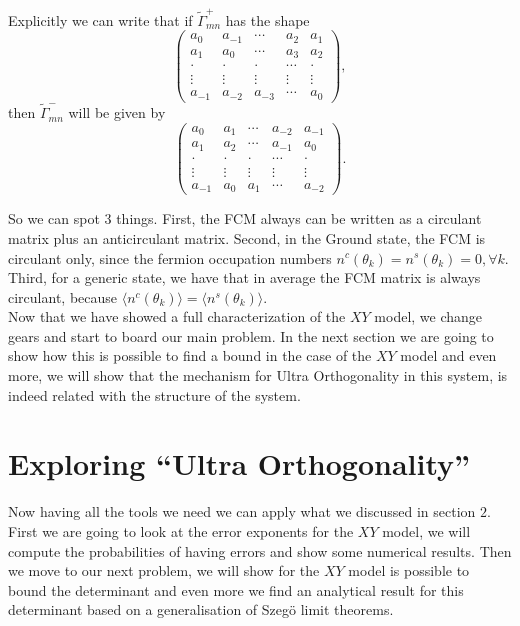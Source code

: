 Explicitly we can write that if $\tilde{\Gamma}^{+}_{mn}$ has the shape
\begin{equation}
\left(\begin{array}{ccccc}
a_{0} & a_{-1} & \cdots & a_{2} & a_{1} \\
a_{1} & a_{0} & \cdots & a_{3} & a_{2} \\
\cdot & \cdot & \cdot & \cdots & \cdot \\
\vdots & \vdots & \vdots & \vdots & \vdots \\
a_{-1} & a_{-2} & a_{-3} & \cdots & a_{0}
\end{array}\right),
\end{equation}
then $\tilde{\Gamma}^{-}_{mn}$ will be given by
\begin{equation}
\left(\begin{array}{ccccc}
a_{0} & a_{1} & \cdots & a_{-2} & a_{-1} \\
a_{1} & a_{2} & \cdots & a_{-1} & a_{0} \\
\cdot & \cdot & \cdot & \cdots & \cdot \\
\vdots & \vdots & \vdots & \vdots & \vdots \\
a_{-1} & a_{0} & a_{1} & \cdots & a_{-2}
\end{array}\right).
\end{equation}

So we can spot 3 things. First, the FCM always can be written as a circulant matrix plus an anticirculant matrix. Second, in the Ground state, the FCM is circulant only, since the fermion occupation numbers $n^{c}\left(\theta_{k}\right)=n^{s}\left(\theta_{k}\right)=0, \forall k$. Third, for a generic state, we have that in average the FCM matrix is always circulant, because $\langle n^{c}\left(\theta_{k}\right)\rangle=\langle n^{s}\left(\theta_{k}\right)\rangle$.\\
Now that we have showed a full characterization of the $XY$ model, we change gears and start to board our main problem. In the next section we are going to show how this is possible to find a bound in the case of the $XY$ model and even more, we will show that the mechanism for Ultra Orthogonality in this system, is indeed related with the structure of the system.


\section{Exploring ``Ultra Orthogonality''}
Now having all the tools we need we can apply what we discussed in section $2$. First we are going to look at the error exponents for the $XY$ model, we will compute the probabilities of having errors and show some numerical results. Then we move to our next problem, we will show for the $XY$ model is possible to bound the determinant and even more we find an analytical result for this determinant based on a generalisation of Szeg\"o limit theorems. 

